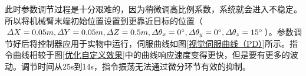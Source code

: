 \documentclass[fontset=fandol,type=bachelor,campus=harbin,bsmainpagenumberline=true]{hithesisbook}
\begin{document}
此时参数调节过程是十分艰难的，因为稍微调高比例系数，系统就会进入不稳定。所以将机械臂末端初始位置设置到更靠近目标的位置（$\varDelta X=0.05m,\varDelta Y=0.05m,\varDelta Z=0.5m,\varDelta \theta _x=0\degree,\varDelta \theta _y=0\degree,\varDelta \theta _z=15\degree$）。参数调节好后将控制器应用于实物中运行，伺服曲线如图\ref{视觉伺服曲线（PD）}所示。指令曲线相较于图\ref{优化自定义效果}中的曲线响应速度变得更快，但是要有更多的波动。调节时间从25s到14s，指令振荡无法通过微分环节有效的抑制。
\begin{figure}[h]
	\centering
\end{figure}
\end{document}
